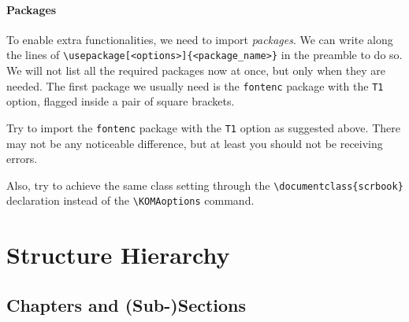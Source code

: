 \paragraph{Packages}
To enable extra functionalities, we need to import \textit{packages}. We can write along the lines of \texttt{\textbackslash usepackage[<options>]\{<package\_name>\}} in the preamble to do so. We will not list all the required packages now at once, but only when they are needed. The first package we usually need is the \verb|fontenc| package with the \verb|T1| option, flagged inside a pair of square brackets.

\begin{exercisebox}
\begin{Exercise}
Try to import the \verb|fontenc| package with the \verb|T1| option as suggested above. There may not be any noticeable difference, but at least you should not be receiving errors.
\end{Exercise}
\begin{Exercise}
Also, try to achieve the same class setting through the \texttt{\textbackslash documentclass\allowbreak[<options>]\{scrbook\}} declaration instead of the \texttt{\textbackslash KOMAoptions} command.
\end{Exercise}
\end{exercisebox}

\section{Structure Hierarchy}

\subsection{Chapters and (Sub-)Sections}

